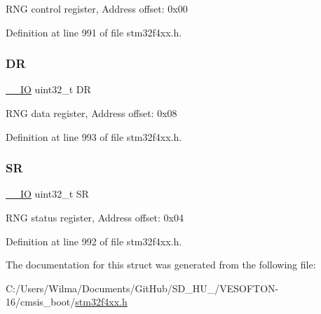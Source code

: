 R\+NG control register, Address offset\+: 0x00 

Definition at line 991 of file stm32f4xx.\+h.

\mbox{\label{struct_r_n_g___type_def_a3df0d8dfcd1ec958659ffe21eb64fa94}} 
\subsubsection{\texorpdfstring{DR}{DR}}
{\footnotesize\ttfamily \hyperlink{group___c_m_s_i_s__core__definitions_gaec43007d9998a0a0e01faede4133d6be}{\+\_\+\+\_\+\+IO} uint32\+\_\+t DR}

R\+NG data register, Address offset\+: 0x08 

Definition at line 993 of file stm32f4xx.\+h.

\mbox{\label{struct_r_n_g___type_def_af6aca2bbd40c0fb6df7c3aebe224a360}} 
\subsubsection{\texorpdfstring{SR}{SR}}
{\footnotesize\ttfamily \hyperlink{group___c_m_s_i_s__core__definitions_gaec43007d9998a0a0e01faede4133d6be}{\+\_\+\+\_\+\+IO} uint32\+\_\+t SR}

R\+NG status register, Address offset\+: 0x04 

Definition at line 992 of file stm32f4xx.\+h.



The documentation for this struct was generated from the following file\+:\begin{DoxyCompactItemize}
\item 
C\+:/\+Users/\+Wilma/\+Documents/\+Git\+Hub/\+S\+D\+\_\+\+H\+U\+\_/\+V\+E\+S\+O\+F\+T\+O\+N-\/16/cmsis\+\_\+boot/\hyperlink{stm32f4xx_8h}{stm32f4xx.\+h}\end{DoxyCompactItemize}
